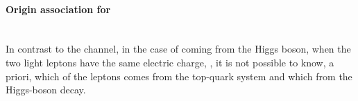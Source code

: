 \paragraph{Origin association for \dilepSStau}\mbox{}\\ %
In contrast to the \dilepOStau channel, in the case of \tauhad coming from the Higgs boson,
 when the two light leptons have the same electric charge, \dilepSStau,
it is not possible to know, a priori, which of the leptons comes from the top-quark system and which 
from the Higgs-boson decay.  

